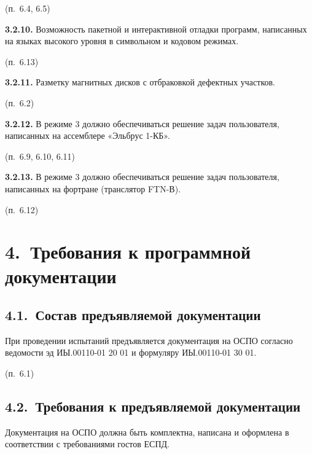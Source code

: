 \documentclass[11pt,a4paper]{article}
\begin{document}
\begin{center}(п.~6.4, 6.5)\end{center}
\par\textbf{3.2.10.} Возможность пакетной и интерактивной отладки программ, написанных на языках высокого уровня в символьном и кодовом режимах.\par
\begin{center}(п.~6.13)\end{center}
\par\textbf{3.2.11.} Разметку магнитных дисков с отбраковкой дефектных участков.\par
\begin{center}(п.~6.2)\end{center}
\par\textbf{3.2.12.} В режиме 3 должно обеспечиваться решение задач пользователя, написанных на ассемблере «Эльбрус 1-КБ».\par
\begin{center}(п.~6.9, 6.10, 6.11)\end{center}
\par\textbf{3.2.13.} В режиме 3 должно обеспечиваться решение задач пользователя, написанных на фортране (транслятор FTN-В).\par
\begin{center}(п.~6.12)\end{center}
\section*{4.~Требования к программной документации}
\subsection*{4.1.~Состав предъявляемой документации}
При проведении испытаний предъявляется документация на ОСПО согласно ведомости эд ИЫ.00110-01 20 01 и формуляру ИЫ.00110-01 30 01.

\begin{center}(п.~6.1)\end{center}
\subsection*{4.2.~Требования к предъявляемой документации}
Документация на ОСПО должна быть комплектна, написана и оформлена в соответствии с требованиями гостов ЕСПД.
\end{document}
